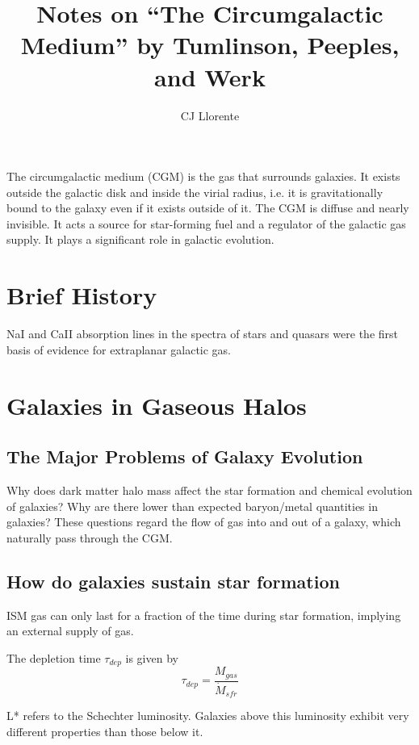 \documentclass[12pt]{article}
\title{Notes on ``The Circumgalactic Medium'' by Tumlinson, Peeples, and Werk}
\author{CJ Llorente}
\begin{document}
 

\baselineskip12pt


\maketitle 


\setcounter{figure}{0}

The circumgalactic medium (CGM) is the gas that surrounds galaxies. It exists outside the galactic disk and inside the virial radius, i.e. it is gravitationally bound to the galaxy even if it exists outside of it. The CGM is diffuse and nearly invisible. It acts a source for star-forming fuel and a regulator of the galactic gas supply. It plays a significant role in galactic evolution.

\section{Brief History}
NaI and CaII absorption lines in the spectra of stars and quasars were the first basis of evidence for extraplanar galactic gas.

\section{Galaxies in Gaseous Halos}

\subsection{The Major Problems of Galaxy Evolution}

Why does dark matter halo mass affect the star formation and chemical evolution of galaxies?
Why are there lower than expected baryon/metal quantities in galaxies?
These questions regard the flow of gas into and out of a galaxy, which naturally pass through the CGM.

\subsection{How do galaxies sustain star formation}
ISM gas can only last for a fraction of the time during star formation, implying an external supply of gas.

The depletion time $\tau_{dep}$ is given by 
$$
\tau_{dep} = \frac{M_{gas}}{\dot M_{sfr}}
$$

L* refers to the Schechter luminosity. Galaxies above this luminosity exhibit very different properties than those below it. 
\end{document}
